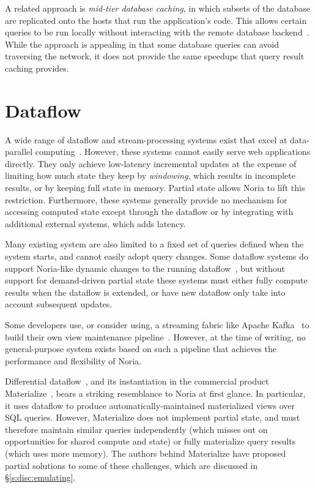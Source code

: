 A related approach is \textit{mid-tier database caching}, in which subsets of
the database are replicated onto the hosts that run the application's code. This
allows certain queries to be run locally without interacting with the remote
database backend~\cite{mtcache}. While the approach is appealing in that some
database queries can avoid traversing the network, it does not provide the same
speedups that query result caching provides.

\section{Dataflow}

A wide range of dataflow and stream-processing systems exist that excel at
data-parallel computing~\cite{dryad, naiad, storm, heron, flink, millwheel,
spark-streaming, stanford-stream, s-store, cloud-dataflow}. However, these
systems cannot easily serve web applications directly. They only achieve
low-latency incremental updates at the expense of limiting how much state they
keep by \textit{windowing}, which results in incomplete results, or by keeping
full state in memory. Partial state allows Noria to lift this restriction.
Furthermore, these systems generally provide no mechanism for accessing computed
state except through the dataflow or by integrating with additional external
systems, which adds latency.

Many existing system are also limited to a fixed set of queries defined when the
system starts, and cannot easily adopt query changes. Some dataflow systems do
support Noria-like dynamic changes to the running dataflow~\cite{ciel, ray}, but
without support for demand-driven partial state these systems must either fully
compute results when the dataflow is extended, or have new dataflow only take
into account subsequent updates.

Some developers use, or consider using, a streaming fabric like Apache
Kafka~\cite{kafka} to build their own view maintenance pipeline~\cite{nyt-kafka,
samza-blogpost}. However, at the time of writing, no general-purpose system
exists based on such a pipeline that achieves the performance and flexibility of
Noria.

Differential dataflow~\cite{differential-dataflow}, and its instantiation in the
commercial product Materialize~\cite{materialize}, bears a striking resemblance
to Noria at first glance. In particular, it uses dataflow to produce
automatically-maintained materialized views over SQL queries. However,
Materialize does not implement partial state, and must therefore maintain
similar queries independently (which misses out on opportunities for shared
compute and state) or fully materialize query results (which uses more memory).
The authors behind Materialize have proposed partial solutions to some of these
challenges, which are discussed in \S\ref{s:disc:emulating}.
